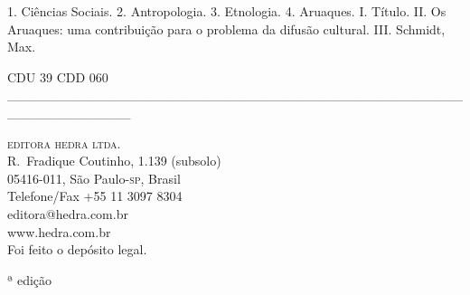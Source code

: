 {\hspace{20pt}\parbox{185pt}{1. Ciências Sociais. 2. Antropologia. 3. Etnologia. 
4. Aruaques. 
I. Título. II. Os Aruaques: uma contribuição para o problema da difusão cultural. III. Schmidt, Max.}

\begin{flushleft}
\hspace{20pt}CDU 39 \hspace{138pt}CDD 060
\_\_\_\_\_\_\_\_\_\_\_\_\_\_\_\_\_\_\_\_\_\_\_\_\_\_\_\_\_\_\_\_\_\_\_\_\_\_\_\_\_\_\_\_\_\_\_\_\_\_\_\_\_\_\_\_\_\_\_\_\_\\
\end{flushleft}



%
\textsc{editora hedra ltda.}\\
R.~Fradique Coutinho, 1.139 (subsolo)\\
05416-011, São Paulo-\textsc{sp}, Brasil\\
Telefone/Fax +55 11 3097 8304\\\smallskip
editora@hedra.com.br\\
www.hedra.com.br\\
Foi feito o depósito legal.\\\endgroup
\pagebreak\raggedleft
\titulagem

{\Large \autor \par\vspace{1.5ex}}
\vspace{1.5cm}

{{\footnotesize{} ª edição} \par}

}
